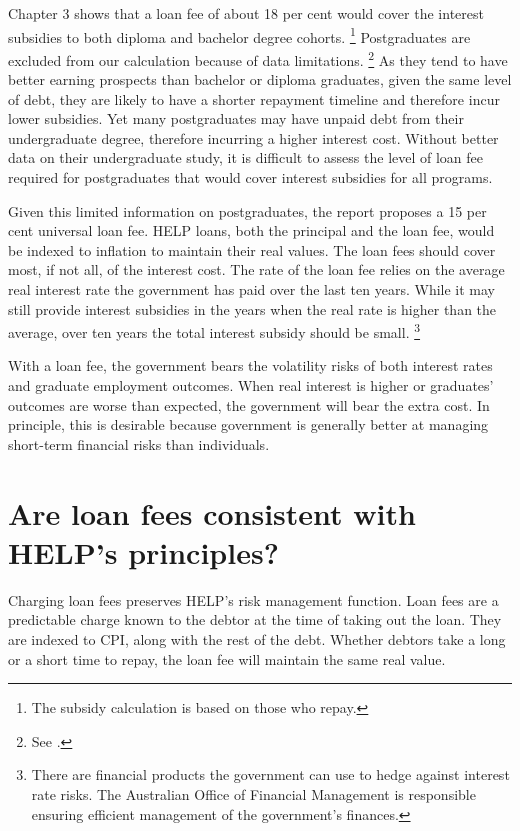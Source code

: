 \documentclass[embargoed]{grattan}
\begin{document}
{Chapter 3 shows that a loan fee of about 18 per cent would cover the interest subsidies to both diploma and bachelor degree cohorts.%
\footnote{The subsidy calculation is based on those who repay.} Postgraduates are excluded from our calculation because of data limitations.%
\footnote{See .} As they tend to have better earning prospects than bachelor or diploma graduates, given the same level of debt, they are likely to have a shorter repayment timeline and therefore incur lower subsidies.
Yet many postgraduates may have unpaid debt from their undergraduate degree, therefore incurring a higher interest cost.
Without better data on their undergraduate study, it is difficult to assess the level of loan fee required for postgraduates that would cover interest subsidies for all programs.

Given this limited information on postgraduates, the report proposes a 15 per cent universal loan fee.
\gls{HELP} loans, both the principal and the loan fee, would be indexed to inflation to maintain their real values.
The loan fees should cover most, if not all, of the interest cost.
The rate of the loan fee relies on the average real interest rate the government has paid over the last ten years.
While it may still provide interest subsidies in the years when the real rate is higher than the average, over ten years the total interest subsidy should be small.%
\footnote{There are financial products the government can use to hedge against interest rate risks.
The Australian Office of Financial Management is responsible ensuring efficient management of the government's finances.}

With a loan fee, the government bears the volatility risks of both interest rates and graduate employment outcomes.
When real interest is higher or graduates' outcomes are worse than expected, the government will bear the extra cost.
In principle, this is desirable because government is generally better at managing short-term financial risks than individuals.

\section[Are loan fees consistent with {HELP}'s principles?]{Are loan fees consistent with \gls{HELP}'s principles?}\label{are-loan-fees-consistent-with-helps-principles}

Charging loan fees preserves \gls{HELP}'s risk management function.
Loan fees are a predictable charge known to the debtor at the time of taking out the loan.
They are indexed to \gls{CPI}, along with the rest of the debt.
Whether debtors take a long or a short time to repay, the loan fee will maintain the same real value.

}
\end{document}
